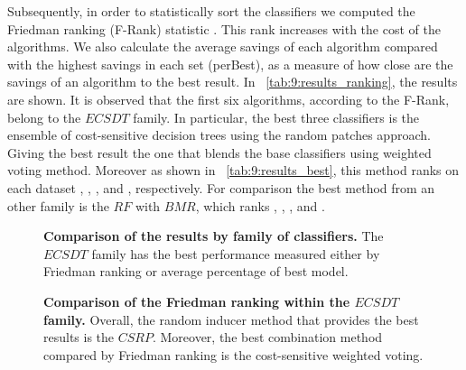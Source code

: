 {  Subsequently, in order to statistically sort the classifiers we computed the Friedman ranking 
  (F-Rank)  statistic \citep{Demsar2006}. This rank increases with the cost of the algorithms. 
  We also calculate the average savings of each algorithm compared with the highest savings in 
each set (perBest), as a  measure of how close are the savings of an algorithm to the best result. 
  In \tablename{~\ref{tab:9:results_ranking}}, the results are shown. It is observed that  the 
  first six algorithms, according to the F-Rank, belong to the $ECSDT$ family. In particular, the 
  best three classifiers is the ensemble of cost-sensitive decision trees using the random patches 
  approach. Giving the best result the one that blends the base classifiers using weighted voting 
  method. Moreover as shown in  \tablename{~\ref{tab:9:results_best}}, this method ranks on each 
  dataset , , ,  and , respectively. For comparison the best 
  method from an other family is the $RF$ with $BMR$, which ranks , , , 
   and .
   
\begin{figure}[!t]
  \centering
  \hfil
  \caption{\textbf{Comparison of the results by family of classifiers.} The $ECSDT$ family has the 
  best performance measured either by Friedman ranking or average percentage of best model.}
  \label{fig:9:comparison_family}
\end{figure}

   \begin{figure}[!t]
  \centering
  \hfil
  \caption{\textbf{Comparison of the Friedman ranking within the $ECSDT$ family.} Overall, the 
  random inducer method that provides the best results is the $CSRP$. Moreover, the best 
  combination method compared by Friedman ranking is the cost-sensitive weighted voting.}
  \label{fig:9:rank_ecsdt}
\end{figure}

}
